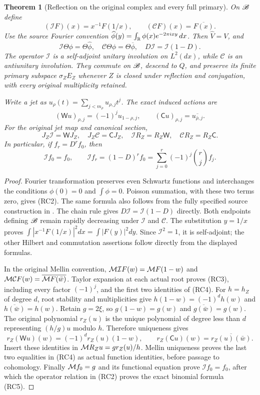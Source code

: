 \documentclass[11pt]{article}
\newtheorem{theorem}{Theorem}[section]
\begin{document}
\begin{theorem}[Reflection on the original complex and every full primary]
On $\mathscr B$ define
\[
 (\mathcal IF)(x)=x^{-1}F(1/x),\qquad (\mathcal CF)(x)=\overline{F(x)}.
 \tag{RC1}
\]
Use the source Fourier convention
$\widehat\phi(y)=\int_\mathbb R\phi(x)e^{-2\pi ixy}\,dx$.
Then $\widehat V=V$, and
\[
 \mathcal I\Theta\phi=\Theta\widehat\phi,
 \quad\mathcal C\Theta\phi=\Theta\overline\phi,
 \quad D\mathcal I=\mathcal I(1-D).
 \tag{RC2}
\]
The operator $\mathcal I$ is a self-adjoint unitary involution on
$L^2(dx)$, while $\mathcal C$ is an antiunitary involution. They
commute on $\mathscr B$, descend to $Q$, and preserve its finite primary
subspace $\sigma_ZE_Z$ whenever $Z$ is closed under reflection and
conjugation, with every original multiplicity retained.

Write a jet as $u_\rho(t)=\sum_{j<m_\rho}u_{\rho,j}t^j$.
The exact induced actions are
\[
 (\mathsf Wu)_{\rho,j}=(-1)^j u_{1-\rho,j},\qquad
 (\mathsf Cu)_{\rho,j}=\overline{u_{\bar\rho,j}}.
 \tag{RC3}
\]
For the original jet map and canonical section,
\[
 J_Z\mathcal I=\mathsf WJ_Z,\quad J_Z\mathcal C=\mathsf CJ_Z,
 \quad \mathcal IR_Z=R_Z\mathsf W,\quad
 \mathcal CR_Z=R_Z\mathsf C.
 \tag{RC4}
\]
In particular, if $f_r=D^rf_0$, then
\[
 \mathcal If_0=f_0,\qquad
 \mathcal If_r=(1-D)^rf_0
 =\sum_{j=0}^r(-1)^j\binom rj f_j.
 \tag{RC5}
\]
\end{theorem}
\begin{proof}
Fourier transformation preserves even Schwartz functions and
interchanges the conditions $\phi(0)=0$ and $\int\phi=0$.
Poisson summation, with these two terms zero, gives (RC2).
The same formula also follows from the fully specified source
construction in \cite[Lemma 4.1]{cr:CCcycles}. The chain rule gives
$D\mathcal I=\mathcal I(1-D)$ directly. Both endpoints defining
$\mathscr B$ remain rapidly decreasing under $\mathcal I$ and $\mathcal C$.
The substitution $y=1/x$ proves
$\int|x^{-1}F(1/x)|^2dx=\int|F(y)|^2dy$.
Since $\mathcal I^2=1$, it is self-adjoint; the other Hilbert and
commutation assertions follow directly from the displayed formulas.

In the original Mellin convention,
$\mathcal M\mathcal IF(w)=\mathcal M F(1-w)$ and
$\mathcal M\mathcal CF(w)=\overline{\mathcal M F(\bar w)}$.
Taylor expansion at each actual root proves (RC3), including every
factor $(-1)^j$, and the first two identities of (RC4).
For $h=h_Z$ of degree $d$, root stability and multiplicities give
$h(1-w)=(-1)^dh(w)$ and $\overline{h(\bar w)}=h(w)$.
Retain $g=2\xi$, so $g(1-w)=g(w)$ and
$\overline{g(\bar w)}=g(w)$. The original polynomial
$r_Z(u)$ is the unique polynomial of degree less than $d$ representing
$(h/g)u$ modulo $h$. Therefore uniqueness gives
\[
 r_Z(\mathsf Wu)(w)=(-1)^d r_Z(u)(1-w),\qquad
 r_Z(\mathsf Cu)(w)=\overline{r_Z(u)(\bar w)}.
\]
Insert these identities in $\mathcal M R_Zu=g r_Z(u)/h$.
Mellin uniqueness proves the last two equalities in (RC4)
as actual function identities, before passage to cohomology.
Finally $\mathcal M f_0=g$ and its functional equation prove
$\mathcal If_0=f_0$, after which the operator relation in (RC2)
proves the exact binomial formula (RC5).
\end{proof}
\end{document}
